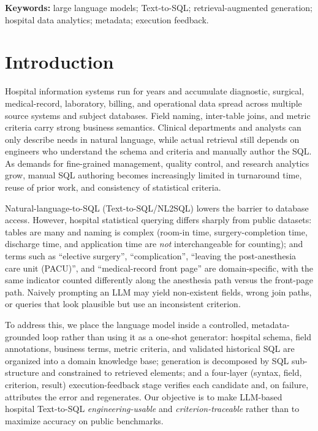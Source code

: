 \documentclass[11pt]{article}
\begin{document}
\noindent\textbf{Keywords:} large language models; Text-to-SQL; retrieval-augmented generation;
hospital data analytics; metadata; execution feedback.

\section{Introduction}
Hospital information systems run for years and accumulate diagnostic, surgical, medical-record,
laboratory, billing, and operational data spread across multiple source systems and subject
databases. Field naming, inter-table joins, and metric criteria carry strong business semantics.
Clinical departments and analysts can only describe needs in natural language, while actual
retrieval still depends on engineers who understand the schema and criteria and manually author the
SQL. As demands for fine-grained management, quality control, and research analytics grow, manual
SQL authoring becomes increasingly limited in turnaround time, reuse of prior work, and consistency
of statistical criteria.

Natural-language-to-SQL (Text-to-SQL/NL2SQL) lowers the barrier to database access. However,
hospital statistical querying differs sharply from public datasets: tables are many and naming is
complex (room-in time, surgery-completion time, discharge time, and application time are
\emph{not} interchangeable for counting); and terms such as ``elective surgery'', ``complication'',
``leaving the post-anesthesia care unit (PACU)'', and ``medical-record front page'' are domain-specific, with the same indicator
counted differently along the anesthesia path versus the front-page path. Naively prompting an LLM
may yield non-existent fields, wrong join paths, or queries that look plausible but use an
inconsistent criterion.

To address this, we place the language model inside a controlled, metadata-grounded loop rather than
using it as a one-shot generator: hospital schema, field annotations, business terms, metric criteria,
and validated historical SQL are organized into a domain knowledge base; generation is decomposed by
SQL sub-structure and constrained to retrieved elements; and a four-layer (syntax, field, criterion,
result) execution-feedback stage verifies each candidate and, on failure, attributes the error and
regenerates. Our objective is to make LLM-based hospital Text-to-SQL \emph{engineering-usable} and
\emph{criterion-traceable} rather than to maximize accuracy on public benchmarks.
\end{document}
